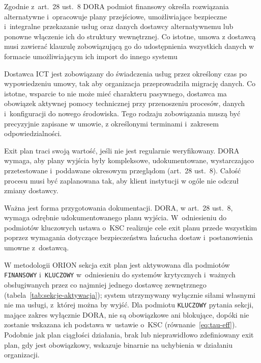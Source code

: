 Zgodnie z~art.~28 ust.~8 DORA podmiot finansowy określa rozwiązania alternatywne i~opracowuje plany przejściowe, umożliwiające bezpieczne i~integralne przekazanie usług oraz danych dostawcy alternatywnemu lub ponowne włączenie ich do struktury wewnętrznej. Co istotne, umowa z dostawcą musi zawierać klauzulę zobowiązującą go do udostępnienia wszystkich danych w formacie umożliwiającym ich import do innego systemu

Dostawca ICT jest zobowiązany do świadczenia usług przez określony czas po wypowiedzeniu umowy, tak aby organizacja przeprowadziła migrację danych. Co istotne, wsparcie to nie może mieć charakteru pasywnego, dostawca ma obowiązek aktywnej pomocy technicznej przy przenoszeniu procesów, danych i~konfiguracji do nowego środowiska. Tego rodzaju zobowiązania muszą być precyzyjnie zapisane w umowie, z określonymi terminami i~zakresem odpowiedzialności.

Exit plan traci swoją wartość, jeśli nie jest regularnie weryfikowany. DORA wymaga, aby plany wyjścia były kompleksowe, udokumentowane, wystarczająco przetestowane i~poddawane okresowym przeglądom (art.~28 ust.~8\autocite{dora2022}). Całość procesu musi być zaplanowana tak, aby klient instytucji w ogóle nie odczuł zmiany dostawcy.

Ważna jest forma przygotowania dokumentacji. DORA, w art.~28 ust.~8\autocite{dora2022}, wymaga odrębnie udokumentowanego planu wyjścia. W~odniesieniu do podmiotów kluczowych ustawa o~KSC\autocite{uksc2026} realizuje cele exit planu przede wszystkim poprzez wymagania dotyczące bezpieczeństwa łańcucha dostaw i~postanowienia umowne z~dostawcą.

W metodologii ORION sekcja exit plan jest aktywowana dla podmiotów \texttt{FINANSOWY} i~\texttt{KLUCZOWY} w~odniesieniu do systemów krytycznych i~ważnych obsługiwanych przez co najmniej jednego dostawcę zewnętrznego (tabela~\ref{tab:sekcje-aktywacja}); system utrzymywany wyłącznie siłami własnymi nie ma usługi, z~której można by wyjść. Dla podmiotu \texttt{KLUCZOWY} pytania sekcji, mające zakres wyłącznie DORA, nie są obowiązkowe ani blokujące, dopóki nie zostanie wskazana ich podstawa w~ustawie o~KSC (równanie~\eqref{eq:tau-eff}). Podobnie jak plan ciągłości działania,  brak lub nieprawidłowo zdefiniowany exit plan, gdy jest obowiązkowy, wskazuje binarnie na uchybienia w działaniu organizacji.

